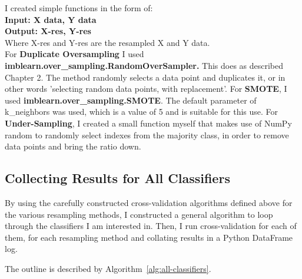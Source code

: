 \documentclass[12pt,a4paper,twoside]{report}
\begin{document}
I created simple functions in the form of:\\
\textbf{Input: X data, Y data}\\
\textbf{Output: X-res, Y-res}\\
Where X-res and Y-res are the resampled X and Y data. \\

For \textbf{Duplicate Oversampling} I used \textbf{imblearn.over\_sampling.RandomOverSampler.} This does as described Chapter 2. The method randomly selects a data point and duplicates it, or in other words 'selecting random data points, with replacement'.
For \textbf{SMOTE}, I used \textbf{imblearn.over\_sampling.SMOTE}. The default parameter of k\_neighbors was used, which is a value of 5 and is suitable for this use. 
For \textbf{Under-Sampling}, I created a small function myself that makes use of NumPy random to randomly select indexes from the majority class, in order to remove data points and bring the ratio down.

\subsection{Collecting Results for All Classifiers}
By using the carefully constructed cross-validation algorithms defined above for the various resampling methods, I constructed a general algorithm to loop through the classifiers I am interested in. Then, I run cross-validation for each of them, for each resampling method and collating results in a Python DataFrame log. 

The outline is described by Algorithm~\ref{alg:all-classifiers}.
\end{document}
